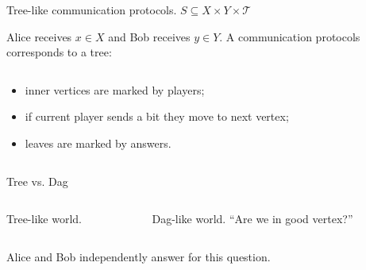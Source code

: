\begin{frame}{Tree-like communication protocols. $S \subseteq X \times Y \times \mathcal{T}$}

    Alice receives $x \in X$ and Bob receives $y \in Y$. A communication protocols corresponds to a tree:

    \begin{columns}[t]
		\begin{column}{0.6\textwidth}
            \begin{itemize}
                \item<2-> inner vertices are marked by players;
	            \item<3-> if current player sends a bit they move to next vertex;
    		    \item<8-> leaves are marked by answers.
	        \end{itemize}

            \vspace{0.5cm}
        \end{column}
        
		\begin{column}{0.3\textwidth}
            
		\end{column}
	\end{columns}

\end{frame}


\begin{frame}{Tree vs. Dag}

	\begin{columns}[t]
		\begin{column}{0.52\textwidth}
            \begin{center}
                Tree-like world.
                \vspace{0.2cm}
                
            \end{center}
        \end{column}

        \pause
		\begin{column}{0.48\textwidth}
            \begin{center}
                Dag-like world. ``Are we in good vertex?''
                \vspace{0.2cm}
                
            \end{center}
		\end{column}
	\end{columns}

    \pause
    \pause
    \vspace{0.4cm}
    Alice and Bob independently answer for this question.
\end{frame}

